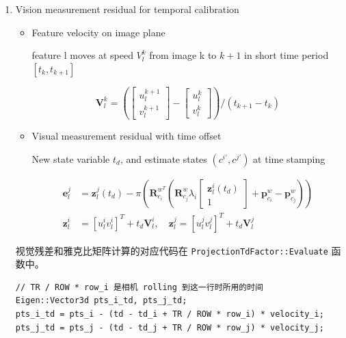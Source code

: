 \documentclass[12pt,a4paper]{article}
\begin{document}
\begin{enumerate}
\item Vision measurement residual for temporal calibration \cite{qin2018online}

\begin{itemize}

\item Feature velocity on image plane

feature l moves at speed $V_l^k$ from image k to $k+1$ in short time period $[t_k,t_{k+1}]$

\begin{equation}
\mathbf{V}_{l}^{k}=\left(\left[\begin{array}{c}{u_{l}^{k+1}} \\ {v_{l}^{k+1}}\end{array}\right]-\left[\begin{array}{c}{u_{l}^{k}} \\ {v_{l}^{k}}\end{array}\right]\right) /\left(t_{k+1}-t_{k}\right)
\end{equation}

\item Visual measurement residual with time offset

New state variable $t_d$, and estimate states $(c^{i'}, c^{j'})$ at time stamping

\begin{equation}
\begin{aligned} 
\mathbf{e}_{l}^{j} &=
\mathbf{z}_{l}^{j}\left(t_{d}\right)-\pi\left(\mathbf{R}_{c_{i}}^{w^{T}}\left(\mathbf{R}_{c_{j}}^{w} \lambda_{i}\left[\begin{array}{c}{\mathbf{z}_{l}^{i}\left(t_{d}\right)} \\ {1}\end{array}\right]+\mathbf{p}_{c_{i}}^{w}-\mathbf{p}_{c_{j}}^{w}\right)\right) \\ 
\mathbf{z}_{l}^{i} &=\left[u_{l}^{i} v_{l}^{i}\right]^{T}+t_{d} \mathbf{V}_{l}^{i}, \quad 
\mathbf{z}_{l}^{j}=\left[u_{l}^{j} v_{l}^{j}\right]^{T}+t_{d} \mathbf{V}_{l}^{j} 
\end{aligned}
\end{equation}

\end{itemize}

视觉残差和雅克比矩阵计算的对应代码在 \verb|ProjectionTdFactor::Evaluate| 函数中。

\begin{lstlisting}
// TR / ROW * row_i 是相机 rolling 到这一行时所用的时间
Eigen::Vector3d pts_i_td, pts_j_td;
pts_i_td = pts_i - (td - td_i + TR / ROW * row_i) * velocity_i;
pts_j_td = pts_j - (td - td_j + TR / ROW * row_j) * velocity_j;


\end{lstlisting}
\end{enumerate}
\end{document}
